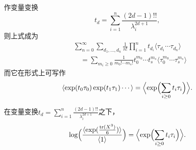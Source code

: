 
作变量变换
\[
t_d=\sum_{i=1}^{n}\frac{(2d-1)!!}{\lambda_i^{2d+1}},
\]
则上式成为
\[
\begin{aligned}
&\sum_{n=0}^{\infty}\sum_{d_1,\dots,d_n}\frac{1}{n!}
\prod_{i=1}^{n}t_{d_i}\langle\tau_{d_1}\cdots\tau_{d_n}\rangle\\
&\quad=\sum_{m_i\ge0}\frac{1}{m_0!\cdots m_s!}
t_0^{m_0}\cdots t_s^{m_s}\langle\tau_0^{m_0}\cdots\tau_s^{m_s}\rangle
\end{aligned}
\]
而它在形式上可写作
\[
\langle\exp(t_0\tau_0)\exp(t_1\tau_1)\cdots\rangle
=\Bigl\langle\exp\Bigl(\sum_{i\ge0}t_i\tau_i\Bigr)\Bigr\rangle.
\]


\begin{theorem}
在变量变换$t_d=\sum_{i=1}^{n}\frac{(2d-1)!!}{\lambda_i^{2d+1}}$之下，
\[
\log\Bigl(\frac{\langle\exp(\frac{\operatorname{tr}(X^3)}{6})\rangle}{\langle 1\rangle}\Bigr)
=\Bigl\langle\exp\Bigl(\sum_{i\ge0}t_i\tau_i\Bigr)\Bigr\rangle.
\]
\end{theorem}

